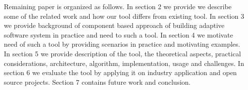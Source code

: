 Remaining paper is organized as follows. In section 2 we provide we describe some of the related work and how our tool differs from existing tool. In section 3 we provide background of component based approach of building adaptive software system in practice and need to such a tool. In section 4 we motivate need of such a tool by providing scenarios in practice and motivating examples. In section 5 we provide description of the tool, the theoretical aspects, practical considerations, architecture, algorithm, implementation, usage and challenges. In section 6 we evaluate the tool by applying it on  industry application and open source projects. Section 7 contains future work and conclusion. 

